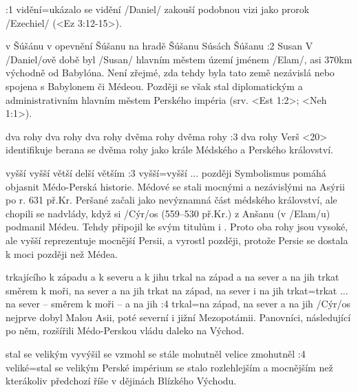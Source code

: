 :1 {vidění}={ukázalo se vidění} \x/Daniel/ zakouší podobnou  vizi jako prorok \x/Ezechiel/ (<Ez 3:12-15>).

   {v Šúšánu}   %
   {v opevnění Šúšanu}   %
   {na hradě Šúšanu}   %
   {Súsách}   %
   {Šúšanu}   %
:2 {Susan} V \x/Daniel/ově době byl \x/Susan/ hlavním městem území jménem \x/Elam/,  
asi 370km východně od Babylóna. Není zřejmé, zda tehdy byla  tato země  nezávislá nebo spojena s Babylonem či Médeou. Později se však stal diplomatickým a administrativním hlavním městem Perského impéria (srv. <Est 1:2>; <Neh 1:1>).



    {dva rohy} %
    {dva rohy}  %
    {dva rohy} %
    {dvěma rohy}  %
    {dvěma rohy}  %
:3 {dva rohy} Verš <20> identifikuje berana se dvěma rohy jako krále Médského a Perského království.

    {vyšší} %
    {vyšší}  %
    {větší} %
    {delší}  %
    {větším}  %
:3 {vyšší}={vyšší ... později} Symbolismus pomáhá objasnit Médo-Perská historie. Médové se stali mocnými a nezávislými na Asýrii po r. 631 př.Kr. Peršané začali jako nevýznamná část médského království, ale chopili se nadvlády, když si \x/Cýr/os (559--530 př.Kr.) z Anšanu (v \x/Elam/u) podmanil Médeu. Tehdy připojil ke svým titulům i . Proto oba rohy jsou vysoké, ale vyšší reprezentuje mocnější Persii, a vyrostl později, protože Persie se dostala k moci později než Médea.

   {trkajícího k západu a k severu a k jihu}   %
   {trkal na západ a na sever a na jih}   %
   {trkat směrem k moři, na sever a na jih}   %
   {trkat na západ, na sever i na jih}   %
   {trkat}={trkat ... na sever -- směrem k moři -- a na jih}   %
:4 {trkal}={na západ, na sever a na jih} \x/Cýr/os nejprve dobyl Malou Asii, poté severní i jižní Mezopotámii. Panovníci, následující po něm, rozšířili Médo-Perskou vládu daleko na Východ. 

   {stal se velikým}   %
   {vyvýšil se}   %
   {vzmohl se}   %
   {stále mohutněl}   %
   {velice zmohutněl}   %
:4 {veliké}={stal se velikým} Perské impérium se stalo rozlehlejším a mocnějším než kterákoliv předchozí říše v dějinách Blízkého Východu.


